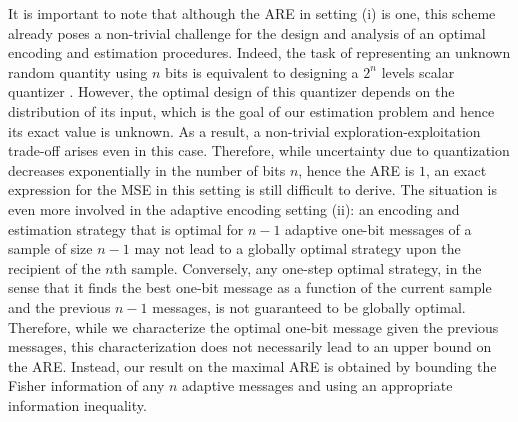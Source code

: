 \documentclass[letterpaper, 11pt]{IEEEtran}      %
\begin{document}

It is important to note that although the ARE in setting (i) is one, this scheme already poses a non-trivial challenge for the design and analysis of an optimal encoding and estimation procedures. Indeed, the task of representing an unknown random quantity using $n$ bits is equivalent to designing a $2^n$ levels scalar quantizer \cite{gray1998quantization}. However, the optimal design of this quantizer depends on the distribution of its input, which is the goal of our estimation problem and hence its exact value is unknown. As a result, a non-trivial exploration-exploitation trade-off arises even in this case. 
Therefore, while uncertainty due to quantization decreases exponentially in the number of bits $n$, hence the ARE is $1$, an exact expression for the MSE in this setting is still difficult to derive. 
%
The situation is even more involved in the adaptive encoding setting (ii): an encoding and estimation strategy that is optimal for $n-1$ adaptive one-bit messages of a sample of size $n-1$ may not lead to a globally optimal strategy upon the recipient of the $n$th sample. Conversely, any one-step optimal strategy, in the sense that it finds the best one-bit message as a function of the current sample and the previous $n-1$ messages, is not guaranteed to be globally optimal. Therefore, while we characterize the optimal one-bit message given the previous messages, this characterization does not necessarily lead to an upper bound on the ARE. Instead, our result on the maximal ARE is obtained by bounding the Fisher information of any $n$ adaptive messages and using an appropriate information inequality. \par
%
\end{document}
